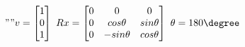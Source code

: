 \documentclass[preview]{standalone}
\begin{document}
\begin{align*}
""
                        \begin{gather*}
                        v=\begin{bmatrix}
                        1\\
                        0\\
                        1
                        \end{bmatrix} \ Rx=\begin{bmatrix}
                        0 & 0 & 0\\
                        0 & cos\theta  & sin\theta \\
                        0 & -sin\theta  & cos\theta 
                        \end{bmatrix} \ \theta =180\degree \\
                        \end{gather*}
\end{align*}
\end{document}
